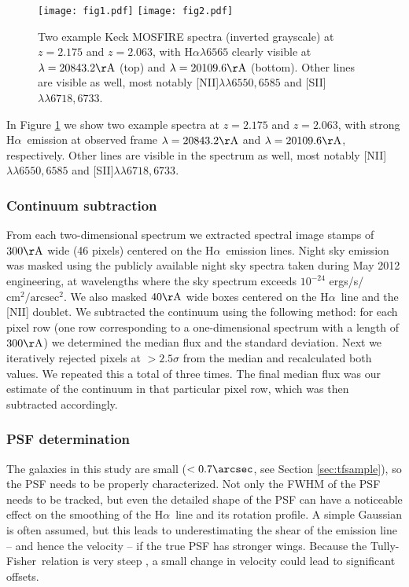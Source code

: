 \documentclass{emulateapj}
\newcommand{\ha}{H$\alpha$}
\newcommand{\A}{\mathrm{\AA}}
\newcommand{\tf}{Tully-Fisher}
\begin{document}
\begin{figure*}
\texttt{[image: fig1.pdf]}
\texttt{[image: fig2.pdf]}
\caption{Two example Keck MOSFIRE spectra (inverted grayscale) at $z=2.175$ and $z=2.063$, with \ha$\lambda6565$ clearly visible at $\lambda=20843.2\mathrm{\AA}$ (top) and $\lambda=20109.6\mathrm{\AA}$ (bottom). Other lines are visible as well, most notably [NII]$\lambda\lambda 6550,6585$ and [SII]$\lambda\lambda 6718,6733$.}
\label{fig:spectra}
\end{figure*}

In Figure \ref{fig:spectra} we show two example spectra at $z=2.175$ and $z=2.063$, with strong \ha\ emission at observed frame $\lambda=20843.2\mathrm{\AA}$ and $\lambda=20109.6\mathrm{\AA}$, respectively. Other lines are visible in the spectrum as well, most notably [NII]$\lambda\lambda 6550,6585$ and [SII]$\lambda\lambda 6718,6733$.


\subsubsection{Continuum subtraction}
From each two-dimensional spectrum we extracted spectral image stamps of $300\A$ wide (46 pixels) centered on the \ha\ emission lines. Night sky emission was masked using the publicly available night sky spectra taken during May 2012 engineering, at wavelengths where the sky spectrum exceeds $10^{-24}$ ergs/s/$\mathrm{cm^2/arcsec^2}$. We also masked $40\A$ wide boxes centered on the \ha\ line and the [NII] doublet. We subtracted the continuum using the following method: for each pixel row (one row corresponding to a one-dimensional spectrum with a length of $300\A$) we determined the median flux and the standard deviation. Next we iteratively rejected pixels at $>2.5\sigma$ from the median and recalculated both values. We repeated this a total of three times. The final median flux was our estimate of the continuum in that particular pixel row, which was then subtracted accordingly. 


\subsubsection{PSF determination}
\label{sec:psf}
{The galaxies in this study are} small {($<0.7\arcsec$, see Section \ref{sec:tfsample})}, so the PSF needs to be properly characterized. Not only the FWHM of the PSF needs to be tracked, but even the detailed shape of the PSF can have a noticeable effect on the smoothing of the \ha\ line and its rotation profile. A simple Gaussian is often assumed, but this leads to underestimating the shear of the emission line -- and hence the velocity -- if the true PSF has stronger wings. Because the \tf\ relation is very steep \citep[e.g.][]{Bell01,Reyes11}, a small change in velocity could lead to significant offsets.
\end{document}
